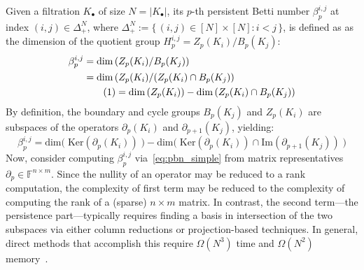 \documentclass[10pt]{article}
\numberwithin{equation}{section}
\newcommand{\+}{%
	\raisebox{0.18ex}{\scaleobj{0.55}{+}}
}
\theoremstyle{definition}
\theoremstyle{definition}
\newcommand\numberthis{\addtocounter{equation}{1}\tag{\theequation}}
\begin{document}
Given a filtration $K_\bullet$ of size $N = \lvert K_\bullet \rvert$, its $p$-th persistent Betti number $\beta_p^{i,j}$ at index $(i,j) \in \Delta_+^N$, where $\Delta_+^N  := \{ \, (i,j) \in [N] \times [N] : i < j \, \}$, is defined as as the dimension of the quotient group $H_p^{i,j} = Z_p(K_i) / B_p(K_j)$: 
\begin{align*} \label{eq:pbn}
	\centering
	\beta_p^{i,j} &= \mathrm{dim} \left ( Z_p(K_i) / B_p(K_j) \right ) \\
	& = \mathrm{dim} \left( Z_p(K_i) / (Z_p(K_i) \cap B_p(K_j) \right) \\
	& \numberthis = \mathrm{dim} \left( Z_p(K_i) \right) - \mathrm{dim}\left( Z_p(K_i) \cap B_p(K_j) \right ) 
\end{align*}
By definition, the boundary and cycle groups $B_p(K_j)$ and $Z_p(K_i)$ are subspaces of the operators $\partial_p(K_i)$ and $\partial_{p+1}(K_j)$, yielding: 
\begin{equation}\label{eq:pbn_simple}
	\beta_p^{i,j} = \mathrm{dim}\big( \; \mathrm{Ker}(\partial_p(K_i)) \; \big) - \mathrm{dim}\big( \; \mathrm{Ker}(\partial_p(K_i)) \cap \mathrm{Im}(\partial_{p+1}(K_j)) \; \big) 
\end{equation}
Now, consider computing $\beta_p^{i,j}$ via~\eqref{eq:pbn_simple} from matrix representatives $\partial_p \in \mathbb{F}^{n \times m}$.
Since the nullity of an operator may be reduced to a rank computation, the complexity of first term may be reduced to the complexity of computing the rank of a (sparse) $n \times m$ matrix. 
In contrast, the second term---the persistence part---typically requires finding a basis in intersection of the two subspaces via either column reductions or projection-based techniques. In general,  direct methods that accomplish this require $\Omega(N^3)$ time and $\Omega(N^2)$ memory~\cite{golub2013matrix}.
\end{document}

